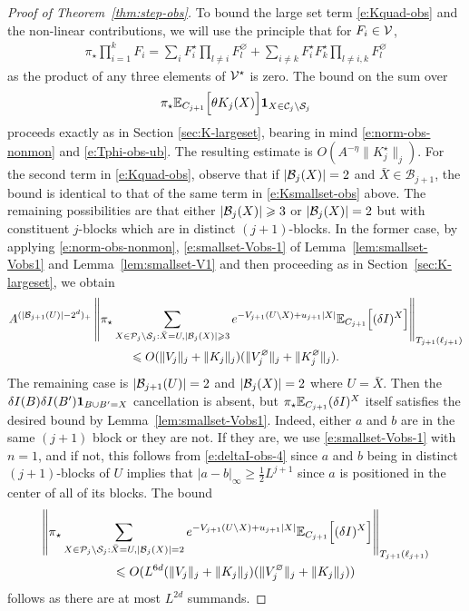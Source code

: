 \documentclass[11pt]{amsart}
\numberwithin{equation}{section}
\numberwithin{theorem}{section}
\newcommand{\1}{{\bf 1}}
\newcommand{\obs}{\star}
\newcommand{\Vbulk}{V^\varnothing}
\newcommand{\Kbulk}{K^\varnothing}
\newcommand{\Kobs}{K^\obs}
\begin{document}
\begin{proof}[Proof of Theorem~\ref{thm:step-obs}]
To bound the large set term \eqref{e:Kquad-obs} and the
  non-linear contributions, we will use the principle that for
  $F_i\in\mathcal V$,
  \begin{align} \label{e:norm-obs-nonmon}
    \pi_\obs \prod_{i=1}^k F_i= \sum_{i}  F_{i}^{\obs}\prod_{l\neq i} F_{l}^{\varnothing}+ \sum_{i\neq k} F_{i}^{\obs} F_{k}^{\obs}\prod_{l\neq i,k}F_{l}^{\varnothing}
  \end{align}
  as the product of any three elements of $\cV^{\obs}$ is zero.  The
  bound on the sum over
\begin{equation}
 \pi_\obs \E_{C_{j+1}}\qB{\theta K_j(X)}\1_{X\in \cC_j\setminus \cS_j}
\end{equation}
proceeds exactly as in Section \ref{sec:K-largeset}, bearing in mind
\eqref{e:norm-obs-nonmon} and \eqref{e:Tphi-obs-ub}. The
  resulting estimate is $O(A^{-\eta}\|\Kobs_{j}\|_{j})$.   
For the second term in \eqref{e:Kquad-obs},
observe that if $|\mathcal B_j(X)|=2$ and $\bar{X}\in \mathcal B_{j+1}$, 
the bound is identical to that of the same term in
\eqref{e:Ksmallset-obs} above.
The remaining possibilities are that either $|\mathcal B_j(X)| \geqslant 3$ or $|\mathcal B_j(X)|=2$ but with constituent $j$-blocks which are in distinct $(j+1)$-blocks.
In the former case, by applying \eqref{e:norm-obs-nonmon},
\eqref{e:smallset-Vobs-1} of Lemma~\ref{lem:smallset-Vobs1} and 
  Lemma~\ref{lem:smallset-V1} and then proceeding as in Section~\ref{sec:K-largeset}, we obtain
\begin{multline}
  A^{(|\cB_{j+1}(U)|-2^d)_+}  \norma{ \pi_\obs \sum_{X\in {\cP_j }\setminus \cS_j: \bar X=U, |\cB_j(X)|\geq 3}e^{-V_{j+1}(U\setminus X)+u_{j+1}|X|} \E_{C_{j+1}}\qB{(\delta I)^X }}_{T_{j+1}(\ell_{j+1})}
  \\
  \leq 
  O (\|V_j\|_j + \|K_j\|_j)(\|\Vbulk_j\|_j + \|\Kbulk_j\|_j).
\end{multline}
%
The remaining case is $|\mathcal B_{j+1}(U)|=2$ and $|\mathcal B_j(X)|=2$ where $U = \bar X$.
Then the $\delta I(B)\delta I(B')\1_{B \cup B'=X}$ cancellation is absent, but $\pi_\obs\E_{C_{j+1}}(\delta I)^X$
itself satisfies the desired bound by
Lemma~\ref{lem:smallset-Vobs1}. Indeed, either $a$ and $b$ are
in the same $(j+1)$ block or they are not. If they are, we use
\eqref{e:smallset-Vobs-1} with $n=1$, and if not, this follows from
\eqref{e:deltaI-obs-4} 
since
$a$ and $b$ being in 
distinct $(j+1)$-blocks of $U$ implies 
that $|a-b|_\infty \geq \frac12 L^{j+1}$ since $a$ is positioned in the center of all of its blocks.
%
%
The bound 
\begin{multline}
\norma{ \pi_\obs  \sum_{X\in {\cP_j }\setminus \cS_j: \bar X=U, |\cB_j(X)|=2} e^{-V_{j+1}(U\setminus X)+u_{j+1}|X|} \E_{C_{j+1}}\qB{(\delta I)^X} }_{T_{j+1}(\ell_{j+1})}
\\  \leq  O(L^{6d}(\|V_j\|_j + \|K_j\|_j)(\|\Vbulk_j\|_j +\|K_j\|_j))
\end{multline}
follows as there are at most $L^{2d}$ summands.


\end{proof}
\end{document}
